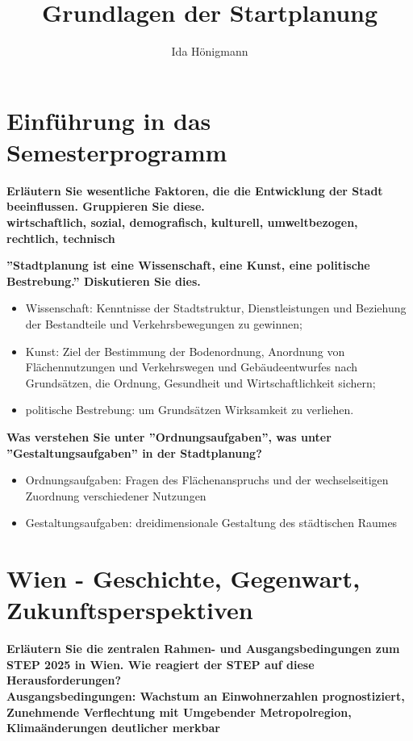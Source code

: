 \documentclass[]{article}
\title{Grundlagen der Startplanung}
\author{Ida Hönigmann}
\newenvironment{question}{\vspace{8mm}\noindent\bfseries}{\\}
\begin{document}
\maketitle

\section{Einführung in das Semesterprogramm}
\begin{question}
	Erläutern Sie wesentliche Faktoren, die die Entwicklung der Stadt beeinflussen. Gruppieren Sie diese.
\end{question}
wirtschaftlich, sozial, demografisch, kulturell, umweltbezogen, rechtlich, technisch

\begin{question}
	''Stadtplanung ist eine Wissenschaft, eine Kunst, eine politische Bestrebung.'' Diskutieren Sie dies.
\end{question}
\begin{itemize}
	\item Wissenschaft: Kenntnisse der Stadtstruktur, Dienstleistungen und Beziehung der Bestandteile und Verkehrsbewegungen zu gewinnen;
	\item Kunst: Ziel der Bestimmung der Bodenordnung, Anordnung von Flächennutzungen und Verkehrswegen und Gebäudeentwurfes nach Grundsätzen, die Ordnung, Gesundheit und Wirtschaftlichkeit sichern;
	\item politische Bestrebung: um Grundsätzen Wirksamkeit zu verliehen.
\end{itemize}

\begin{question}
	Was verstehen Sie unter ''Ordnungsaufgaben'', was unter ''Gestaltungsaufgaben'' in der Stadtplanung?
\end{question}
\begin{itemize}
	\item Ordnungsaufgaben: Fragen des Flächenanspruchs und der wechselseitigen Zuordnung verschiedener Nutzungen
	\item Gestaltungsaufgaben: dreidimensionale Gestaltung des städtischen Raumes
\end{itemize}

\section{Wien - Geschichte, Gegenwart, Zukunftsperspektiven}
\begin{question}
	Erläutern Sie die zentralen Rahmen- und Ausgangsbedingungen zum STEP 2025 in Wien. Wie reagiert der STEP auf diese Herausforderungen?
\end{question}
Ausgangsbedingungen: Wachstum an Einwohnerzahlen prognostiziert, Zunehmende Verflechtung mit Umgebender Metropolregion, Klimaänderungen deutlicher merkbar
\end{document}
